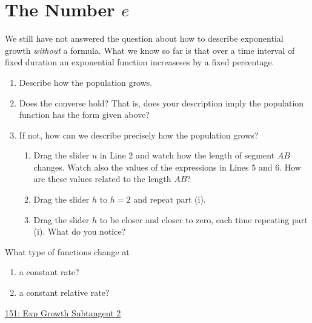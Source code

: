 \documentclass{ximera}
\begin{document}
\section{The Number $e$}
We still have not answered the question about how to describe exponential growth \emph{without} a formula. What we know so far is that over a time interval of fixed duration an exponential function increaseses by a fixed percentage.   






\begin{enumerate}
\item Describe how the population grows.

\item Does the converse hold? That is, does your description imply the population function has the form given above?

\item If not, how can we describe precisely how the population grows?

\begin{enumerate}
\item Drag the slider $u$ in Line 2 and watch how the length of segment $AB$ changes. Watch also the values of the expressions in Lines 5 and 6. How are these values related to the length $AB$?

\item Drag the slider $h$ to $h=2$ and repeat part (i).

\item Drag the slider $h$ to be closer and closer to zero, each time repeating part (i). What do you notice? 

\end{enumerate}

\end{enumerate}





\begin{question}  \label{Qlgkfglbnbn}
What type of functions change at 
\begin{enumerate}
\item a constant rate?

\item a constant relative rate?
\end{enumerate}
\end{question}


\begin{exploration} \label{EdfERERE}

\href{https://www.desmos.com/calculator/zlfka62ec0}{151: Exp Growth Subtangent 2}

 
\begin{onlineOnly}
    \begin{center}
\end{center}
\end{onlineOnly}


\end{exploration}
\end{document}
